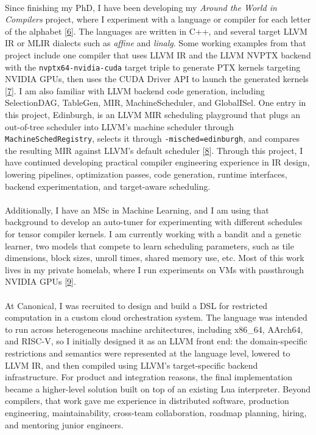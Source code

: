 \paragraph{} %
Since finishing my PhD, I have been developing my \emph{Around the World in Compilers} project, where I experiment with a language or compiler for each letter of the alphabet [\href{\atwurl}{6}]. The languages are written in C++, and several target LLVM IR or MLIR dialects such as \emph{affine} and \emph{linalg}. Some working examples from that project include one compiler that uses LLVM IR and the LLVM NVPTX backend with the \texttt{nvptx64-nvidia-cuda} target triple to generate PTX kernels targeting NVIDIA GPUs, then uses the CUDA Driver API to launch the generated kernels [\href{\cairolang}{7}]. I am also familiar with LLVM backend code generation, including SelectionDAG, TableGen, MIR, MachineScheduler, and GlobalISel. One entry in this project, Edinburgh, is an LLVM MIR scheduling playground that plugs an out-of-tree scheduler into LLVM's machine scheduler through \texttt{MachineSchedRegistry}, selects it through \texttt{-misched=edinburgh}, and compares the resulting MIR against LLVM's default scheduler [\href{\edinburghurl}{8}]. Through this project, I have continued developing practical compiler engineering experience in IR design, lowering pipelines, optimization passes, code generation, runtime interfaces, backend experimentation, and target-aware scheduling.

\paragraph{} %
Additionally, I have an MSc in Machine Learning, and I am using that background to develop an auto-tuner for experimenting with different schedules for tensor compiler kernels. I am currently working with a bandit and a genetic learner, two models that compete to learn scheduling parameters, such as tile dimensions, block sizes, unroll times, shared memory use, etc. Most of this work lives in my private homelab, where I run experiments on VMs with passthrough NVIDIA GPUs [\href{\homelaburl}{9}].

\paragraph{} %
At Canonical, I was recruited to design and build a DSL for restricted computation in a custom cloud orchestration system. The language was intended to run across heterogeneous machine architectures, including x86\_64, AArch64, and RISC-V, so I initially designed it as an LLVM front end: the domain-specific restrictions and semantics were represented at the language level, lowered to LLVM IR, and then compiled using LLVM's target-specific backend infrastructure. For product and integration reasons, the final implementation became a higher-level solution built on top of an existing Lua interpreter. Beyond compilers, that work gave me experience in distributed software, production engineering, maintainability, cross-team collaboration, roadmap planning, hiring, and mentoring junior engineers.

